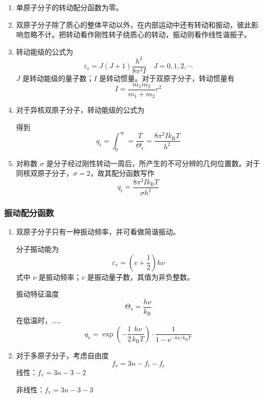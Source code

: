 \begin{enumerate}
    \item 单原子分子的转动配分函数为零。
    \item 双原子分子除了质心的整体平动以外，在内部运动中还有转动和振动，彼此影响忽略不计。把转动看作刚性转子绕质心的转动，振动则看作线性谐振子。
    \item 转动能级的公式为
    \begin{equation*}
        \varepsilon_\mathrm{r} = J (J + 1) \frac{h^2}{8\pi^2 I} \quad J = 0, 1, 2, \cdots
    \end{equation*}
    $J$ 是转动能级的量子数；$I$ 是转动惯量。对于双原子分子，转动惯量有
    \begin{equation*}
        I = \frac{m_1 m_2}{m_1 + m_2} r^2
    \end{equation*}
    \item 对于异核双原子分子，转动能级的公式为

    得到
    \begin{equation}
        q_{\mathrm{r}} = \int_{0}^{\infty} = \frac{T}{\varTheta_{\mathrm{r}}} = \frac{8\pi^2 I k_\mathrm{B} T}{h^2}
    \end{equation}
    \item 对称数 $\sigma$ 是分子经过刚性转动一周后，所产生的不可分辨的几何位置数。对于同核双原子分子，$\sigma = 2$，故其配分函数写作
    \begin{equation}
        q_{\mathrm{r}} = \frac{8\pi^2 I k_\mathrm{B} T}{\sigma h^2}
    \end{equation}
\end{enumerate}

\subsubsection{振动配分函数}

\begin{enumerate}
    \item 双原子分子只有一种振动频率，并可看做简谐振动。
    
    分子振动能为
    \begin{equation}
        \varepsilon_{\mathrm{v}} = \left(v + \frac12\right) h \nu
    \end{equation}
    式中 $\nu$ 是振动频率；$v$ 是振动量子数，其值为非负整数。

    振动特征温度
    \begin{equation}
        \varTheta_{\mathrm{v}} = \frac{h \nu}{k_\mathrm{B}}
    \end{equation}
    在低温时，……
    \begin{equation}
        q_{\mathrm{v}} = \exp\left(-\frac12 \frac{h \nu}{k_\mathrm{B} T}\right) \cdot \frac1{1 - \mathrm{e}^{-h \nu / k_\mathrm{B} T}}
    \end{equation}
    \item 对于多原子分子，考虑自由度
    \begin{equation}
        f_{\mathrm{v}} = 3n - f_{\mathrm{t}} - f_{\mathrm{r}}
    \end{equation}
    线性：$f_{\mathrm{v}} = 3n - 3 - 2$
    
    非线性：$f_{\mathrm{v}} = 3n - 3 - 3$
\end{enumerate}


